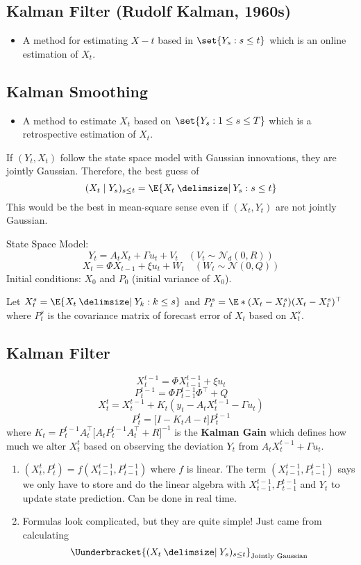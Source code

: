 \subsection*{Kalman Filter (Rudolf Kalman, 1960s)}
\begin{itemize}
    \item A method for estimating $ X-t $ based in $ \set{Y_s:s\le t} $
          which is an online estimation of $ X_t $.
\end{itemize}
\subsection*{Kalman Smoothing}
\begin{itemize}
    \item A method to estimate $ X_t $ based on $ \set{Y_s:1\le s\le T} $
          which is a retrospective estimation of $ X_t $.
\end{itemize}
\begin{Remark}{}{}
    If $ (Y_t,X_t) $ follow the state space model with Gaussian innovations,
    they are jointly Gaussian. Therefore, the best guess of
    \[ (X_t\mid Y_s)_{s\le t}=\E{X_t\given Y_s:s\le t} \]
    This would be the best in mean-square sense even if $ (X_t,Y_t) $ are not
    jointly Gaussian.
\end{Remark}
State Space Model:
\[ Y_t=A_t X_t+\Gamma u_t+V_t\quad (V_t \sim \mathcal{N}_d(0,R)) \]
\[ X_t=\Phi X_{t-1}+\xi u_t+W_t\quad (W_t \sim \mathcal{N}(0,Q)) \]
Initial conditions: $ X_0 $ and $ P_0 $ (initial variance of $ X_0 $).

Let $ X_t^s=\E{X_t\given Y_k:k\le s} $ and $ P_t^s=\E*{(X_t-X_t^s)(X_t-X_t^s)^\top} $
where $ P_t^s $ is the covariance matrix of forecast error of $ X_t $ based on $ X_t^s $.
\subsection*{Kalman Filter}
\[ X_t^{t-1}=\Phi X_{t-1}^{t-1}+\xi u_t \]
\[ P_t^{t-1}=\Phi P_{t-1}^{t-1}\Phi^\top +Q \]
\[ X_t^t = X_t^{t-1}+K_t(y_t-A_t X_t^{t-1}-\Gamma u_t) \]
\[ P_t^t=\bigl[I-K_t A-t\bigr]P_t^{t-1} \]
where $ K_t=P_t^{t-1}A_t^\top\bigl[A_t P_t^{t-1}A_t^\top +R\bigr]^{-1} $
is the \textbf{Kalman Gain} which defines how much we alter $ X_t^t $ based on
observing the deviation $ Y_t $ from $ A_t X_t^{t-1}+\Gamma u_t $.
\begin{Remark}{}{}
    \begin{enumerate}[(1)]
        \item $ (X_t^t,P_t^t)=f(X_{t-1}^{t-1},P_{t-1}^{t-1}) $ where $ f $ is linear.
              The term $ (X_{t-1}^{t-1},P_{t-1}^{t-1}) $ says we only have to store
              and do the linear algebra with $ X_{t-1}^{t-1}, P_{t-1}^{t-1} $
              and $ Y_t $ to update state prediction. Can be done in real time.
        \item Formulas look complicated, but they are quite simple! Just came
              from calculating
              \[ \Uunderbracket{(X_t\given Y_s)_{s\le t}}_{\text{Jointly Gaussian}} \]
    \end{enumerate}
\end{Remark}
